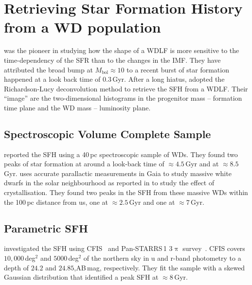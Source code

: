 \documentclass[fleqn,usenatbib]{mnras}
\begin{document}
\section{Retrieving Star Formation History from a WD population}
\citet{1990ApJ...352..605N} was the pioneer in studying how the shape of
a WDLF is more sensitive to the time-dependency of the SFR than to the changes
in the IMF. They have attributed the broad bump at $M_{\mathrm{bol}} \approx 10$
to a recent burst of star formation happened at a look back time of 0.3\,Gyr.
After a long hiatus, \citet{2013MNRAS.434.1549R} adopted the Richardson-Lucy
deconvolution method to retrieve the SFH from a WDLF. Their ``image'' are the
two-dimensional histograms in the progenitor mass -- formation time plane and 
the WD mass -- luminosity plane. 

\subsection{Spectroscopic Volume Complete Sample}
\citet{2014ApJ...791...92T} reported the SFH using a 40\,pc spectroscopic sample
of WDs. They found two peaks of star formation at around a look-back time of
$\approx4.5$\,Gyr and at $\approx8.5$\,Gyr. \citet{2019ApJ...878L..11I}
uses accurate parallactic measurements in Gaia to study massive white dwarfs in
the solar neighbourhood as reported in \citet{2019Natur.565..202T} to study the
effect of crystallisation. They found two peaks in the SFH from these massive
WDs within the 100\,pc distance from us, one at $\approx2.5$\,Gyr and one at
$\approx7$\,Gyr.

\subsection{Parametric SFH}
\citet{2019ApJ...887..148F} investigated the SFH using
CFIS~\citep{2017ApJ...848..128I} and Pan-STARRS\,1 3$\uppi$
survey~\citep{2016arXiv161205560C}. CFIS covers $10,000$\,deg$^2$ and
$5000$\,deg$^2$ of the northern sky in u and r-band photometry to a depth of
$24.2$ and $24.85$,AB\,mag, respectively. They fit the sample with a skewed
Gaussian distribution that identified a peak SFH at $\approx8$\,Gyr.

\end{document}
